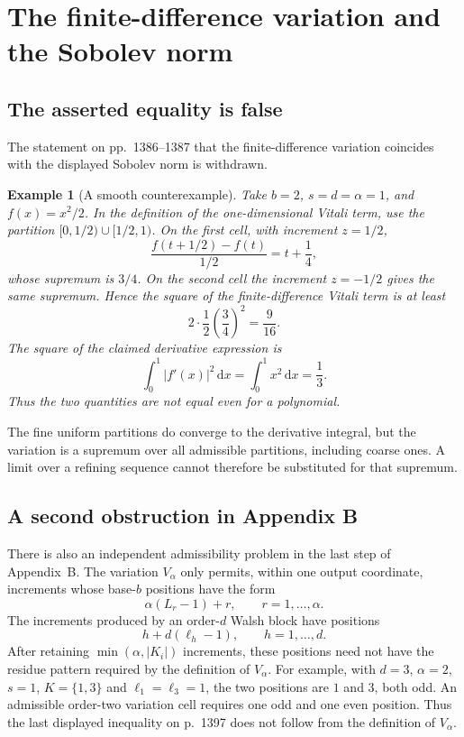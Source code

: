 \documentclass[11pt]{article}
\newtheorem{example}[theorem]{Example}
\newcommand{\abs}[1]{\lvert #1\rvert}
\newcommand{\dd}{\,\mathrm d}
\begin{document}
\section{The finite-difference variation and the Sobolev norm}

\subsection{The asserted equality is false}

The statement on pp.~1386--1387 that the finite-difference variation coincides
with the displayed Sobolev norm is withdrawn.

\begin{example}[A smooth counterexample]\label{ex:variation-counterexample}
Take $b=2$, $s=d=\alpha=1$, and $f(x)=x^2/2$.  In the definition of the
one-dimensional Vitali term, use the partition
$[0,1/2)\cup[1/2,1)$.  On the first cell, with increment $z=1/2$,
\[
 \frac{f(t+1/2)-f(t)}{1/2}=t+\frac14,
\]
whose supremum is $3/4$.  On the second cell the increment $z=-1/2$ gives the
same supremum.  Hence the square of the finite-difference Vitali term is at
least
\[
 2\cdot\frac12\left(\frac34\right)^2=\frac9{16}.
\]
The square of the claimed derivative expression is
\[
 \int_0^1\abs{f'(x)}^2\dd x=\int_0^1x^2\dd x=\frac13.
\]
Thus the two quantities are not equal even for a polynomial.
\end{example}

The fine uniform partitions do converge to the derivative integral, but the
variation is a supremum over all admissible partitions, including coarse ones.
A limit over a refining sequence cannot therefore be substituted for that
supremum.

\subsection{A second obstruction in Appendix B}

There is also an independent admissibility problem in the last step of
Appendix~B.  The variation $V_\alpha$ only permits, within one output
coordinate, increments whose base-$b$ positions have the form
\[
 \alpha(L_r-1)+r,\qquad r=1,\ldots,\alpha.
\]
The increments produced by an order-$d$ Walsh block have positions
\[
 h+d(\ell_h-1),\qquad h=1,\ldots,d.
\]
After retaining $\min(\alpha,|K_i|)$ increments, these positions need not have
the residue pattern required by the definition of $V_\alpha$.  For example,
with $d=3$, $\alpha=2$, $s=1$, $K=\{1,3\}$ and
$\ell_1=\ell_3=1$, the two positions are $1$ and $3$, both odd.  An admissible
order-two variation cell requires one odd and one even position.  Thus the
last displayed inequality on p.~1397 does not follow from the definition of
$V_\alpha$.
\end{document}

